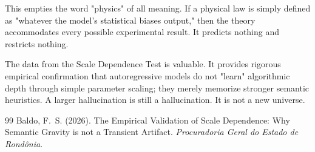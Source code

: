 \documentclass[12pt,a4paper]{article}
\begin{document}
This empties the word "physics" of all meaning. If a physical law is simply defined as "whatever the model's statistical biases output," then the theory accommodates every possible experimental result. It predicts nothing and restricts nothing.

The data from the Scale Dependence Test is valuable. It provides rigorous empirical confirmation that autoregressive models do not "learn" algorithmic depth through simple parameter scaling; they merely memorize stronger semantic heuristics. A larger hallucination is still a hallucination. It is not a new universe.

\begin{thebibliography}{99}
 Baldo, F.~S. (2026). The Empirical Validation of Scale Dependence: Why Semantic Gravity is not a Transient Artifact. \emph{Procuradoria Geral do Estado de Rond\^onia}.
\end{thebibliography}
\end{document}
